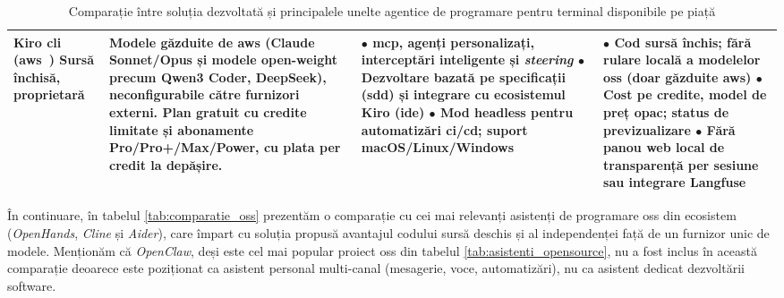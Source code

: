 \documentclass[12pt, a4paper, oneside, romanian]{teza-upb}
\begin{document}
\begin{table}[H]
\begin{tabularx}{\textwidth}{@{} >{\hsize=0.55\hsize\RaggedRight}X >{\hsize=0.95\hsize\RaggedRight}X >{\hsize=1.25\hsize\RaggedRight}X >{\hsize=1.25\hsize\RaggedRight}X @{}}
        \textbf{Kiro \ac{cli}} \newline (\ac{aws}~\cite{web_kiro}) \newline Sursă închisă, proprietară &
        Modele găzduite de \ac{aws} (Claude Sonnet/Opus și modele open-weight precum Qwen3 Coder, DeepSeek), neconfigurabile către furnizori externi. \newline
        Plan gratuit cu credite limitate și abonamente Pro/Pro+/Max/Power, cu plata per credit la depășire. &
        $\bullet$ \ac{mcp}, agenți personalizați, interceptări inteligente și \textit{steering}\newline
        $\bullet$ Dezvoltare bazată pe specificații (\ac{sdd}) și integrare cu ecosistemul Kiro (\ac{ide})\newline
        $\bullet$ Mod headless pentru automatizări \ac{ci}/\ac{cd}; suport macOS/Linux/Windows &
        $\bullet$ Cod sursă închis; fără rulare locală a modelelor \ac{oss} (doar găzduite \ac{aws})\newline
        $\bullet$ Cost pe credite, model de preț opac; status de previzualizare\newline
        $\bullet$ Fără panou web local de transparență per sesiune sau integrare Langfuse \\

        \bottomrule
      \end{tabularx}
      \caption{Comparație între soluția dezvoltată și principalele unelte agentice de programare pentru terminal disponibile pe piață}
      \label{tab:comparatie_clis}
    \end{table}

    În continuare, în tabelul \ref{tab:comparatie_oss} prezentăm o comparație cu cei mai relevanți asistenți de programare \ac{oss} din ecosistem (\textit{OpenHands}, \textit{Cline} și \textit{Aider}), care împart cu soluția propusă avantajul codului sursă deschis și al independenței față de un furnizor unic de modele. Menționăm că \textit{OpenClaw}, deși este cel mai popular proiect \ac{oss} din tabelul \ref{tab:asistenti_opensource}, nu a fost inclus în această comparație deoarece este poziționat ca asistent personal multi-canal (mesagerie, voce, automatizări), nu ca asistent dedicat dezvoltării software.
\end{document}
